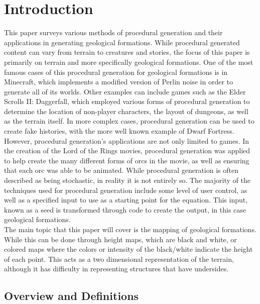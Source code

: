 \documentclass[12pt]{report}
\begin{document}
	\tableofcontents
	
	\clearpage
	
	\chapter{Introduction}
		This paper surveys various methods of procedural generation and their applications in generating geological formations. While procedural generated content can vary from terrain to creatures and stories, the focus of this paper is primarily on terrain and more specifically geological formations. One of the most famous cases of this procedural generation for geological formations is in Minecraft, which implements a modified version of Perlin noise in order to generate all of its worlds. Other examples can include games such as the Elder Scrolls II: Daggerfall, which employed various forms of procedural generation to determine the location of non-player characters, the layout of dungeons, as well as the terrain itself. In more complex cases, procedural generation can be used to create fake histories, with the more well known example of Dwarf Fortress. However, procedural generation's applications are not only limited to games. In the creation of the Lord of the Rings movies, procedural generation was applied to help create the many different forms of orcs in the movie, as well as ensuring that each orc was able to be animated. While procedural generation is often described as being stochastic, in reality it is not entirely so. The majority of the techniques used for procedural generation include some level of user control, as well as a specified input to use as a starting point for the equation. This input, known as a seed is transformed through code to create the output, in this case geological formations. \\
		
		\noindent The main topic that this paper will cover is the mapping of geological formations. While this can be done through height maps, which are black and white, or colored maps where the colors or intensity of the black/white indicate the height of each point. This acts as a two dimensional representation of the terrain, although it has difficulty in representing structures that have undersides. 
		
		
		\section{Overview and Definitions}
		
\end{document}
